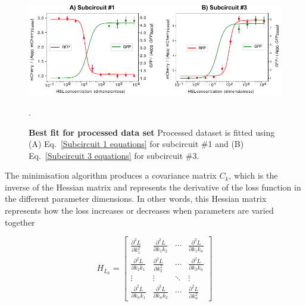 \begin{figure}[H] %
    \centering
    \begin{adjustbox}{center}
        \includegraphics[width=1\textwidth]{chapters/Chapter 2/dose_responses_bestfit} %
    \end{adjustbox}
    \caption{\textbf{Best fit for processed data set} Processed dataset is fitted using (A) Eq.~\ref{Subcircuit 1 equations} for subcircuit \#1 and (B) Eq.~\ref{Subcircuit 3 equations} for subcircuit \#3. }.
    \label{fig:dose_responses_bestfit} %
\end{figure}


The minimisation algorithm produces a covariance matrix $C_k$, which is the inverse of the Hessian matrix and represents the derivative of the loss function in the different parameter dimensions.
In other words, this Hessian matrix represents how the loss increases or decreases when parameters are varied together

\begin{equation}
    H_{L_{k}} = \begin{bmatrix}
                     \frac{\partial^2 L}{\partial k_1^2} & \frac{\partial^2 L}{\partial k_1 k_2} & \cdots & \frac{\partial^2 L}{\partial k_1 k_{n}} \\
                     \frac{\partial^2 L}{\partial k_2 k_1} & \frac{\partial^2 L}{\partial k_2^2} & \cdots & \frac{\partial^2 L}{\partial k_2  k_{n}} \\
                     \vdots & \vdots & \ddots & \vdots \\
                     \frac{\partial^2 L}{\partial k_{n}k_1} & \frac{\partial^2 L}{\partial k_{n}  k_2} & \cdots & \frac{\partial^2 L}{\partial k_{n}^2}
    \end{bmatrix}
\end{equation}


